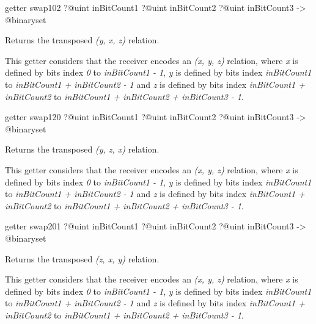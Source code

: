 \begin{galgas3box}
getter swap102
  ?@uint inBitCount1
  ?@uint inBitCount2
  ?@uint inBitCount3
  -> @binaryset
\end{galgas3box}

Returns the transposed \emph{(y, x, z)} relation.

This getter considers that the receiver encodes an \emph{(x, y, z)} relation, where \emph{x} is defined by bits index \emph{0} to \emph{inBitCount1  - 1}, \emph{y} is defined by bits index \emph{inBitCount1} to \emph{inBitCount1 + inBitCount2 - 1} and  \emph{z} is defined by bits index \emph{inBitCount1 + inBitCount2} to \emph{inBitCount1 + inBitCount2 + inBitCount3 - 1}.







\begin{galgas3box}
getter swap120
  ?@uint inBitCount1
  ?@uint inBitCount2
  ?@uint inBitCount3
  -> @binaryset
\end{galgas3box}

Returns the transposed \emph{(y, z, x)} relation.

This getter considers that the receiver encodes an \emph{(x, y, z)} relation, where \emph{x} is defined by bits index \emph{0} to \emph{inBitCount1  - 1}, \emph{y} is defined by bits index \emph{inBitCount1} to \emph{inBitCount1 + inBitCount2 - 1} and  \emph{z} is defined by bits index \emph{inBitCount1 + inBitCount2} to \emph{inBitCount1 + inBitCount2 + inBitCount3 - 1}.







\begin{galgas3box}
getter swap201
  ?@uint inBitCount1
  ?@uint inBitCount2
  ?@uint inBitCount3
  -> @binaryset
\end{galgas3box}

Returns the transposed \emph{(z, x, y)} relation.

This getter considers that the receiver encodes an \emph{(x, y, z)} relation, where \emph{x} is defined by bits index \emph{0} to \emph{inBitCount1  - 1}, \emph{y} is defined by bits index \emph{inBitCount1} to \emph{inBitCount1 + inBitCount2 - 1} and  \emph{z} is defined by bits index \emph{inBitCount1 + inBitCount2} to \emph{inBitCount1 + inBitCount2 + inBitCount3 - 1}.






